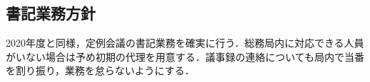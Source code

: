 \subsection*{書記業務方針}


2020年度と同様，定例会議の書記業務を確実に行う．総務局内に対応できる人員がいない場合は予め初期の代理を用意する．議事録の連絡についても局内で当番を割り振り，業務を怠らないようにする．
